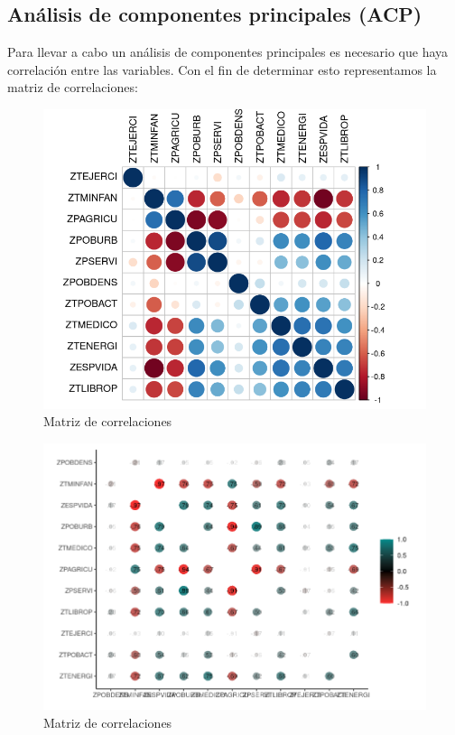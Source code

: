 \documentclass[11pt,a4paper]{article}
\begin{document}
    \subsection{Análisis de componentes principales (ACP)}
    
    Para llevar a cabo un análisis de componentes principales es necesario que haya correlación entre las variables. Con el fin de determinar esto representamos la matriz de correlaciones:
    
            	\begin{figure}[H]
    	    \centering
    	    \includegraphics[scale=0.5]{cor.png}
    	    \caption{Matriz de correlaciones}
    	    \label{cor}
    	\end{figure}
    	
    	            	\begin{figure}[H]
    	    \centering
    	    \includegraphics[scale=0.5]{cor2.png}
    	    \caption{Matriz de correlaciones}
    	    \label{cor2}
    	\end{figure}
    	
\end{document}
